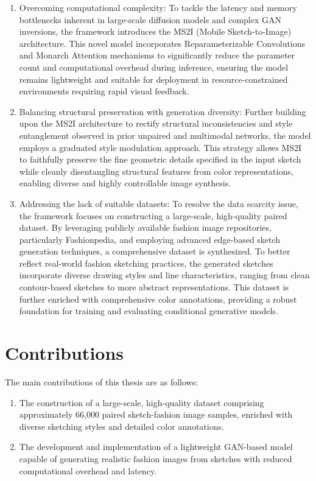 \documentclass[../main.tex]{subfiles}
\begin{document}
\begin{enumerate}
    \item Overcoming computational complexity: To tackle the latency and memory bottlenecks inherent in large-scale diffusion models and complex GAN inversions, the framework introduces the MS2I (Mobile Sketch-to-Image) architecture. This novel model incorporates Reparameterizable Convolutions and Monarch Attention mechanisms to significantly reduce the parameter count and computational overhead during inference, ensuring the model remains lightweight and suitable for deployment in resource-constrained environments requiring rapid visual feedback.
    
    \item Balancing structural preservation with generation diversity: Further building upon the MS2I architecture to rectify structural inconsistencies and style entanglement observed in prior unpaired and multimodal networks, the model employs a graduated style modulation approach. This strategy allows MS2I to faithfully preserve the fine geometric details specified in the input sketch while cleanly disentangling structural features from color representations, enabling diverse and highly controllable image synthesis.
    
    \item Addressing the lack of suitable datasets: To resolve the data scarcity issue, the framework focuses on constructing a large-scale, high-quality paired dataset. By leveraging publicly available fashion image repositories, particularly Fashionpedia, and employing advanced edge-based sketch generation techniques, a comprehensive dataset is synthesized. To better reflect real-world fashion sketching practices, the generated sketches incorporate diverse drawing styles and line characteristics, ranging from clean contour-based sketches to more abstract representations. This dataset is further enriched with comprehensive color annotations, providing a robust foundation for training and evaluating conditional generative models.
\end{enumerate}

\section{Contributions}
\label{sec:contributions}
The main contributions of this thesis are as follows:
\begin{enumerate}
    \item The construction of a large-scale, high-quality dataset comprising approximately 66,000 paired sketch-fashion image samples, enriched with diverse sketching styles and detailed color annotations.
    \item The development and implementation of a lightweight GAN-based model capable of generating realistic fashion images from sketches with reduced computational overhead and latency.
\end{enumerate}
\end{document}
